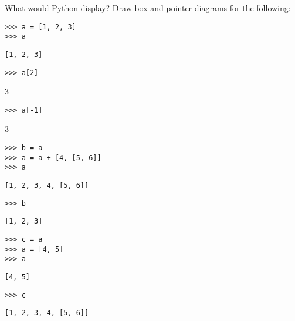 \begin{blocksection}
\question What would Python display? Draw box-and-pointer diagrams for the following:

\begin{lstlisting}
>>> a = [1, 2, 3]
>>> a
\end{lstlisting}
\begin{solution}[.25in]
\begin{lstlisting}
[1, 2, 3]
\end{lstlisting}
\end{solution}

\begin{lstlisting}
>>> a[2]
\end{lstlisting}
\begin{solution}[.25in]
3
\end{solution}

\begin{lstlisting}
>>> a[-1]
\end{lstlisting}
\begin{solution}[.25in]
3
\end{solution}

\end{blocksection}
\begin{blocksection}

\begin{lstlisting}
>>> b = a
>>> a = a + [4, [5, 6]]
>>> a
\end{lstlisting}
\begin{solution}[.25in]
\begin{lstlisting}
[1, 2, 3, 4, [5, 6]]
\end{lstlisting}
\end{solution}
\begin{lstlisting}
>>> b
\end{lstlisting}
\begin{solution}[.25in]
\begin{lstlisting}
[1, 2, 3]
\end{lstlisting}
\end{solution}

\end{blocksection}
\begin{blocksection}

\begin{lstlisting}
>>> c = a
>>> a = [4, 5]
>>> a
\end{lstlisting}
\begin{solution}[.25in]
\begin{lstlisting}
[4, 5]
\end{lstlisting}
\end{solution}

\begin{lstlisting}
>>> c
\end{lstlisting}
\begin{solution}[.25in]
\begin{lstlisting}
[1, 2, 3, 4, [5, 6]]
\end{lstlisting}
\end{solution}
\end{blocksection}

